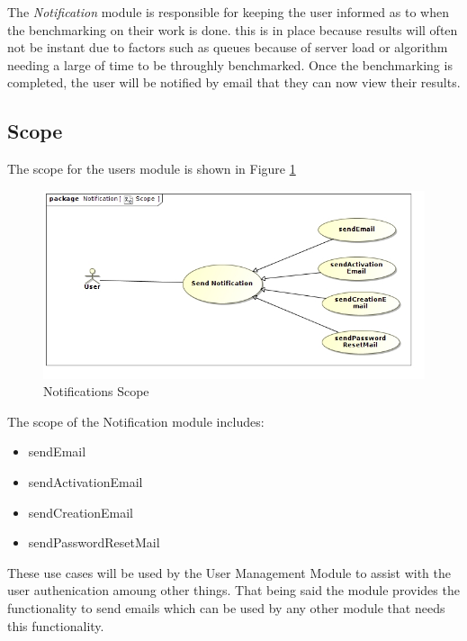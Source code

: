 The \textit{Notification} module is responsible for keeping the user informed 
as to when the benchmarking on their work is done. this is in place because
results will often not be instant due to factors such as queues because of server
load or algorithm needing a large of time to be throughly benchmarked. Once the
benchmarking is completed, the user will be notified by email that they can now
view their results.

\subsection{Scope}
The scope for the users module is shown in Figure \ref{Notifications Scope}
\begin{figure}[H]
	\begin{center}
		\includegraphics[scale=0.5]{../Diagrams and Charts/Notifications/Scope.jpg}
		\caption{Notifications Scope}
		\label{Notifications Scope}
	\end{center}	
\end{figure}
The scope of the Notification module includes:
\begin{itemize}
	\item sendEmail
	\item sendActivationEmail
	\item sendCreationEmail
	\item sendPasswordResetMail
\end{itemize}

These use cases will be used by the User Management Module to assist with the user
authenication amoung other things. That being said the module provides the
functionality to send emails which can be used by any other module that needs this
functionality.

